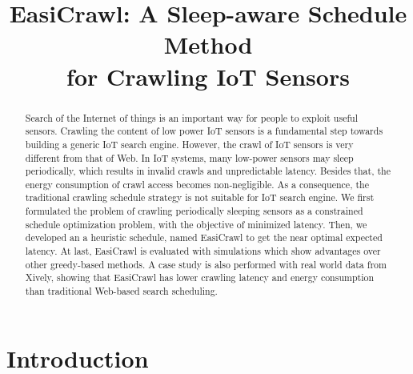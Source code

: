 \documentclass[conference]{IEEEtran}
\begin{document}
\title{EasiCrawl: A Sleep-aware Schedule Method \\for Crawling IoT Sensors}

\author{
}

\maketitle


\begin{abstract}
	
Search of the Internet of things is an important way for people to exploit useful sensors. Crawling the content of low power IoT sensors is a fundamental step towards building a generic IoT search engine.
However, the crawl of IoT sensors is very different from that of Web. In IoT systems, many low-power sensors may sleep periodically, which results in invalid crawls and unpredictable latency. Besides that, the energy consumption of crawl access becomes non-negligible.
As a consequence, the traditional crawling schedule strategy is not suitable for IoT search engine.
We first formulated the problem of crawling periodically sleeping sensors as a constrained schedule optimization problem, with the objective of minimized latency. 
Then, we developed an a heuristic schedule, named EasiCrawl to get the near optimal expected latency. 
At last, EasiCrawl is evaluated with simulations which show advantages over other greedy-based methods.
A case study is also performed with real world data from Xively, showing that EasiCrawl has lower crawling latency and energy consumption than traditional Web-based search scheduling.

\end{abstract}

\IEEEpeerreviewmaketitle

\section{Introduction} \label{introduction}
\end{document}
